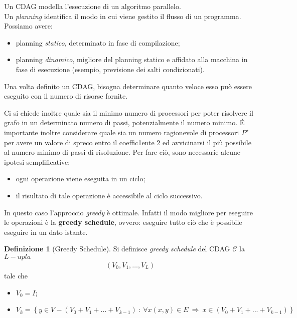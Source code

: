 \documentclass[a4paper,portrait,12pt]{article}
\theoremstyle{definition}
\newtheorem{definition}{Definizione}[section]
\begin{document}
Un CDAG modella l'esecuzione di un algoritmo parallelo.\\

Un \textit{planning} identifica il modo in cui viene gestito il flusso di un programma. Possiamo avere:
\begin{itemize}
\item planning \textit{statico}, determinato in fase di compilazione;
\item planning \textit{dinamico}, migliore del planning statico e affidato alla macchina in fase di esecuzione (esempio, previsione dei salti condizionati).
\end{itemize}

Una volta definito un CDAG, bisogna determinare quanto veloce esso può essere eseguito con il numero di risorse fornite.

Ci si chiede inoltre quale sia il minimo numero di processori per poter risolvere il grafo in un determinato numero di passi, potenzialmente il numero minimo.
\'E importante inoltre considerare quale sia un numero ragionevole di processori $P^{\star}$ per avere un valore di spreco entro il coeffic1ente $2$ ed avvicinarsi il più possibile al numero minimo di passi di risoluzione.
Per fare ciò, sono necessarie alcune ipotesi semplificative:
\begin{itemize}
\item ogni operazione viene eseguita in un ciclo;
\item il risultato di tale operazione è accessibile al ciclo successivo.
\end{itemize}

In questo caso l'approccio \textit{greedy} è ottimale. Infatti il modo migliore per eseguire le operazioni è la \textbf{greedy schedule}, ovvero: eseguire tutto ciò che è possibile eseguire in un dato istante.

\begin{definition}[Greedy Schedule]
Si definisce \textit{greedy schedule} del CDAG $\mathcal{C}$ la $L-upla$
\begin{gather*}
\left(V_0,V_1,\hdots,V_L\right)
\end{gather*}
tale che
\begin{itemize}
\item $V_0 = I$;
\item $V_k = \left\{y \in V - \left(V_0 + V_1 +...+ V_{k-1}\right)\ :\ \forall x (x,y) \in E\ \Rightarrow\ x \in \left(V_0 + V_1 + ... + V_{k-1}\right)\right\}$
\end{itemize}
\end{definition}
\end{document}
